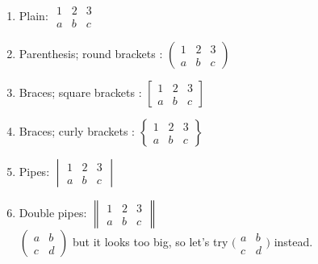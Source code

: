 \documentclass{report}
\begin{document}
\begin{enumerate}
    \item Plain: $ \begin{matrix} 1& 2 & 3 \\ a & b & c \end{matrix}$
    \item Parenthesis; round brackets : $\begin{pmatrix}
        1 & 2 & 3 \\ a & b & c 
    \end{pmatrix}$
    \item Braces; square brackets : $ \begin{bmatrix}
        1 & 2 & 3 \\ a & b & c
    \end{bmatrix}$
    \item  Braces; curly brackets : $\begin{Bmatrix}
       1 & 2 & 3 \\ a & b & c 
   \end{Bmatrix}$ 
    \item Pipes: $\begin{vmatrix}
        1 & 2 & 3 \\ a & b & c
    \end{vmatrix}$
    \item Double pipes: $ \begin{Vmatrix}
        1 & 2 & 3 \\ a & b & c
    \end{Vmatrix}$ \\
    $\begin{pmatrix}
        a & b \\
        c & d
    \end{pmatrix}$
    but it looks too big, so let's try
    $\big(\begin{smallmatrix}
        a & b \\
        c & d
    \end{smallmatrix}\big)$
    instead.


\end{enumerate}
\end{document}
